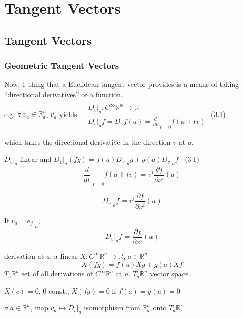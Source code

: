 \section{Tangent Vectors}


\subsection*{Tangent Vectors}



\subsubsection*{Geometric Tangent Vectors}

Now, 1 thing that a Euclidean tangent vector provides is a means of taking ``directional derivatives'' of a function. \\
e.g. $\forall \, v_a \in \mathbb{R}^n_a$, $v_a$ yields $\begin{aligned} & \quad \\ 
  & \left. D_v \right|_a : C^{\infty}\mathbb{R}^n \to \mathbb{R} \\ 
  & \left. D_v \right|_a f  =   D_v f(a) = \left. \frac{d}{dt} \right|_{t=0}f(a+tv) \end{aligned}$ (3.1)

which takes the directional derivative in the direction $v$ at $a$.  

$\left. D_v \right|_a$ linear and $\left. D_v \right|_a(fg) = f(a) \left. D_v \right|_a g + g(a) \left. D_v\right|_a f$ \quad \, (3.1)
\[
\left. \frac{d}{dt} \right|_{t=0} f(a+tv) = v^i \frac{\partial f}{ \partial x^i}(a)
\]

\[
 \left. D_v \right|_a f = v^i \frac{ \partial f}{ \partial x^i}(a)
\]

If $v_a = \left. e_j \right|_a$, 
\[
\left. D_v \right|_a f = \frac{ \partial f}{ \partial x^i}(a)
\]

derivation at $a$, a linear $X: C^{\infty}\mathbb{R}^n \to \mathbb{R}$, $a\in \mathbb{R}^n$
\[
X(fg) = f(a) Xg + g(a) Xf
\]
$T_a\mathbb{R}^n$ set of all derivations of $C^{\infty}\mathbb{R}^n$ at $a$.  $T_a\mathbb{R}^n$ vector space.  

\begin{lemma}[3.1] $X(c) =0$, $0$ const., $X(fg) = 0$ if $f(a) = g(a) =0$ \end{lemma}


\begin{proposition}[3.2] $\forall\, a \in \mathbb{R}^n$, map $v_a \mapsto \left. D_v \right|_a$ isomorphism from $\mathbb{R}^n_a $ onto $T_a\mathbb{R}^n$ \end{proposition}

